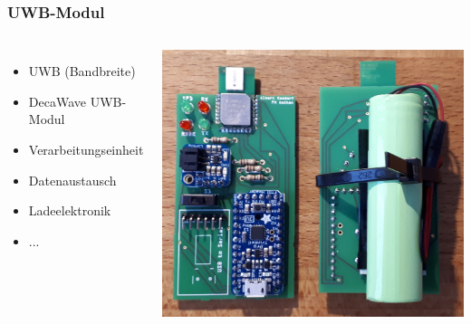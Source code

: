 \documentclass{beamer}
\begin{document}
%
% 
%
\begin{frame}
	\frametitle{UWB-Modul}

	\begin{columns}
		\begin{itemize}
			\item UWB (Bandbreite)
			\item DecaWave UWB-Modul
			\item Verarbeitungseinheit
			\item Datenaustausch
			\item Ladeelektronik
			\item ...
		\end{itemize}
		
			\includegraphics[scale=0.2]{uwb_modul}
			
	\end{columns}
\end{frame}
\end{document}
